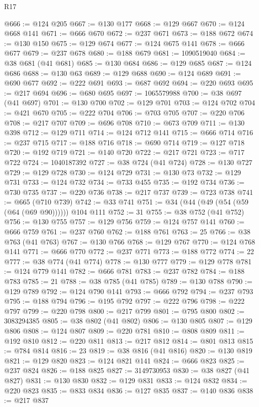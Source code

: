\begin{lexlean}{R17}
\begin{coremodule}
@666 := @124 @205
@667 := @130 @177
@668 := @129 @667
@670 := @124 @668 @141
@671 := @666 @670
@672 := @237 @671
@673 := @188 @672
@674 := @130 @150
@675 := @129 @674
@677 := @124 @675 @141
@678 := @666 @677
@679 := @237 @678
@680 := @188 @679
@681 := 1090519040
@684 := @38 @681 (@41 @681)
@685 := @130 @684
@686 := @129 @685
@687 := @124 @686
@688 := @130 @63
@689 := @129 @688
@690 := @124 @689
@691 := @690 @677
@692 := @222 @691
@693 := @687 @692
@694 := @220 @693
@695 := @217 @694
@696 := @680 @695
@697 := 1065579988
@700 := @38 @697 (@41 @697)
@701 := @130 @700
@702 := @129 @701
@703 := @124 @702
@704 := @421 @670
@705 := @222 @704
@706 := @703 @705
@707 := @220 @706
@708 := @217 @707
@709 := @696 @708
@710 := @673 @709
@711 := @130 @398
@712 := @129 @711
@714 := @124 @712 @141
@715 := @666 @714
@716 := @237 @715
@717 := @188 @716
@718 := @690 @714
@719 := @127 @718
@720 := @192 @719
@721 := @140 @720
@722 := @217 @721
@723 := @717 @722
@724 := 1040187392
@727 := @38 @724 (@41 @724)
@728 := @130 @727
@729 := @129 @728
@730 := @124 @729
@731 := @130 @73
@732 := @129 @731
@733 := @124 @732
@734 := @733 @455
@735 := @192 @734
@736 := @730 @735
@737 := @220 @736
@738 := @217 @737
@739 := @723 @738
@741 := @665 (@710 @739)
@742 := @33 @741
@751 := @34 (@44 (@49 (@54 (@59 (@64 (@69 @90)))))) @104 @111
@752 := 31
@755 := @38 @752 (@41 @752)
@756 := @130 @755
@757 := @129 @756
@759 := @124 @757 @141
@760 := @666 @759
@761 := @237 @760
@762 := @188 @761
@763 := 25
@766 := @38 @763 (@41 @763)
@767 := @130 @766
@768 := @129 @767
@770 := @124 @768 @141
@771 := @666 @770
@772 := @237 @771
@773 := @188 @772
@774 := 22
@777 := @38 @774 (@41 @774)
@778 := @130 @777
@779 := @129 @778
@781 := @124 @779 @141
@782 := @666 @781
@783 := @237 @782
@784 := @188 @783
@785 := 21
@788 := @38 @785 (@41 @785)
@789 := @130 @788
@790 := @129 @789
@792 := @124 @790 @141
@793 := @666 @792
@794 := @237 @793
@795 := @188 @794
@796 := @195 @792
@797 := @222 @796
@798 := @222 @797
@799 := @220 @798
@800 := @217 @799
@801 := @795 @800
@802 := 3083294385
@805 := @38 @802 (@41 @802)
@806 := @130 @805
@807 := @129 @806
@808 := @124 @807
@809 := @220 @781
@810 := @808 @809
@811 := @192 @810
@812 := @220 @811
@813 := @217 @812
@814 := @801 @813
@815 := @784 @814
@816 := 23
@819 := @38 @816 (@41 @816)
@820 := @130 @819
@821 := @129 @820
@823 := @124 @821 @141
@824 := @666 @823
@825 := @237 @824
@826 := @188 @825
@827 := 3149730953
@830 := @38 @827 (@41 @827)
@831 := @130 @830
@832 := @129 @831
@833 := @124 @832
@834 := @220 @823
@835 := @833 @834
@836 := @127 @835
@837 := @140 @836
@838 := @217 @837

\end{coremodule}
\end{lexlean}

